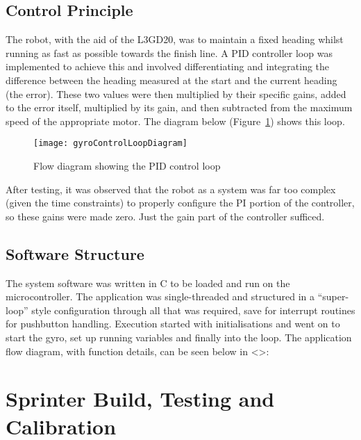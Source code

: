   \subsection{Control Principle}
  \label{sub:Control Principle}
    The robot, with the aid of the L3GD20, was to maintain a fixed heading whilst running as fast as possible towards the finish line. A PID controller loop was implemented to achieve this and involved differentiating and integrating the difference between the heading measured at the start and the current heading (the error). These two values were then multiplied by their specific gains, added to the error itself, multiplied by its gain, and then subtracted from the maximum speed of the appropriate motor. The diagram below (Figure~\ref{fig:gyroControlLoopDiagram}) shows this loop.

    \begin{figure}[H]
      \begin{center}
        \texttt{[image: gyroControlLoopDiagram]}
        \caption{Flow diagram showing the PID control loop}
        \label{fig:gyroControlLoopDiagram}
      \end{center}
    \end{figure}

    After testing, it was observed that the robot as a system was far too complex (given the time constraints) to properly configure the PI portion of the controller, so these gains were made zero. Just the gain part of the controller sufficed.

  \subsection{Software Structure}
  \label{sub:Software Structure}
    The system software was written in C to be loaded and run on the microcontroller. The application was single-threaded and structured in a ``super-loop'' style configuration through all that was required, save for interrupt routines for pushbutton handling. Execution started with initialisations and went on to start the gyro, set up running variables and finally into the loop. The application flow diagram, with function details, can be seen below in <>:

\clearpage
\section{Sprinter Build, Testing and Calibration}
\label{sec:Sprinter Build, Testing and Calibration}

